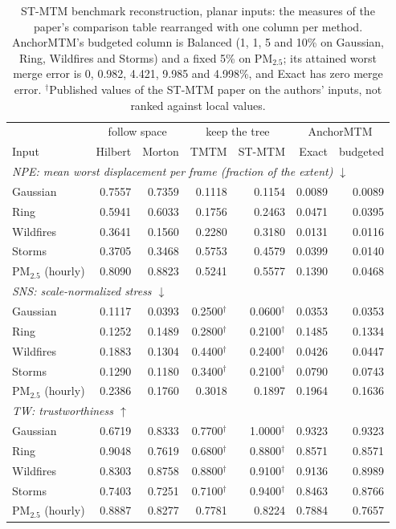 \documentclass[preprint]{vgtc}   %
\begin{document}
\begin{table}[t]
\centering\small
\caption{ST-MTM benchmark reconstruction, planar inputs: the measures of the paper's comparison table rearranged with one column per method. AnchorMTM's budgeted column is Balanced (1, 1, 5 and 10\% on Gaussian, Ring, Wildfires and Storms) and a fixed 5\% on PM$_{2.5}$; its attained worst merge error is 0, 0.982, 4.421, 9.985 and 4.998\%, and Exact has zero merge error. $^\dagger$Published values of the ST-MTM paper on the authors' inputs, not ranked against local values.}\label{tab:full-layout}
\setlength{\tabcolsep}{5pt}
\begin{tabular}{l|rr|rr|rr}\toprule
 & \multicolumn{2}{c|}{follow space} & \multicolumn{2}{c|}{keep the tree} & \multicolumn{2}{c}{AnchorMTM}\\
Input & Hilbert & Morton & TMTM & ST-MTM & Exact & budgeted\\\midrule
\multicolumn{7}{l}{\emph{NPE: mean worst displacement per frame (fraction of the extent) $\downarrow$}}\\
Gaussian & 0.7557 & 0.7359 & 0.1118 & 0.1154 & 0.0089 & 0.0089\\
Ring & 0.5941 & 0.6033 & 0.1756 & 0.2463 & 0.0471 & 0.0395\\
Wildfires & 0.3641 & 0.1560 & 0.2280 & 0.3180 & 0.0131 & 0.0116\\
Storms & 0.3705 & 0.3468 & 0.5753 & 0.4579 & 0.0399 & 0.0140\\
PM$_{2.5}$ (hourly) & 0.8090 & 0.8823 & 0.5241 & 0.5577 & 0.1390 & 0.0468\\\midrule
\multicolumn{7}{l}{\emph{SNS: scale-normalized stress $\downarrow$}}\\
Gaussian & 0.1117 & 0.0393 & 0.2500$^\dagger$ & 0.0600$^\dagger$ & 0.0353 & 0.0353\\
Ring & 0.1252 & 0.1489 & 0.2800$^\dagger$ & 0.2100$^\dagger$ & 0.1485 & 0.1334\\
Wildfires & 0.1883 & 0.1304 & 0.4400$^\dagger$ & 0.2400$^\dagger$ & 0.0426 & 0.0447\\
Storms & 0.1290 & 0.1180 & 0.3400$^\dagger$ & 0.2100$^\dagger$ & 0.0790 & 0.0743\\
PM$_{2.5}$ (hourly) & 0.2386 & 0.1760 & 0.3018 & 0.1897 & 0.1964 & 0.1636\\\midrule
\multicolumn{7}{l}{\emph{TW: trustworthiness $\uparrow$}}\\
Gaussian & 0.6719 & 0.8333 & 0.7700$^\dagger$ & 1.0000$^\dagger$ & 0.9323 & 0.9323\\
Ring & 0.9048 & 0.7619 & 0.6800$^\dagger$ & 0.8800$^\dagger$ & 0.8571 & 0.8571\\
Wildfires & 0.8303 & 0.8758 & 0.8800$^\dagger$ & 0.9100$^\dagger$ & 0.9136 & 0.8989\\
Storms & 0.7403 & 0.7251 & 0.7100$^\dagger$ & 0.9400$^\dagger$ & 0.8463 & 0.8766\\
PM$_{2.5}$ (hourly) & 0.8887 & 0.8277 & 0.7781 & 0.8224 & 0.7884 & 0.7657\\\bottomrule
\end{tabular}
\end{table}
\end{document}

